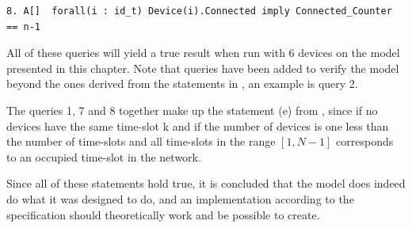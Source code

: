 \begin{lstlisting}[style=UPPAAL, title={The query requires that if a device is connected, is it then true that the number of devices connected to a network is equal to one less the number of time-slots in the frame of a network. }]
8. A[]  forall(i : id_t) Device(i).Connected imply Connected_Counter == n-1
\end{lstlisting}

All of these queries will yield a true result when run with 6 devices on the model presented in this chapter.
Note that queries have been added to verify the model beyond the ones derived from the statements in , an example is query 2.

The queries 1, 7 and 8 together make up the statement (e) from , since if no devices have the same time-slot k and if the number of devices is one less than the number of time-slots and all time-slots in the range $[1, N-1]$ corresponds to an occupied time-slot in the network.

Since all of these statements hold true, it is concluded that the model does indeed do what it was designed to do, and an implementation according to the specification should theoretically work and be possible to create.
